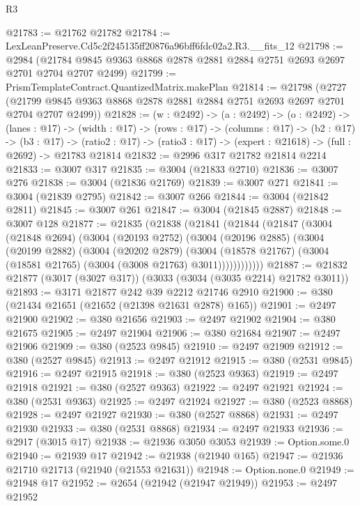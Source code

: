 \begin{lexlean}{R3}
\begin{coremodule}
@21783 := @21762 @21782
@21784 := LexLeanPreserve.Cd5c2f245135ff20876a96bff6fdc02a2.R3.__fits_12
@21798 := @2984
    (@21784 @9845 @9363 @8868 @2878 @2881 @2884 @2751 @2693 @2697 @2701 @2704 @2707 @2499)
@21799 := PrismTemplateContract.QuantizedMatrix.makePlan
@21814 := @21798
    (@2727 (@21799 @9845 @9363 @8868 @2878 @2881 @2884 @2751 @2693 @2697 @2701 @2704 @2707 @2499))
@21828 := (w : @2492) ->
  (a : @2492) ->
  (o : @2492) ->
  (lanes : @17) ->
  (width : @17) ->
  (rows : @17) ->
  (columns : @17) ->
  (b2 : @17) ->
  (b3 : @17) ->
  (ratio2 : @17) -> (ratio3 : @17) -> (expert : @21618) -> (full : @2692) -> @21783 @21814
@21832 := @2996 @317 @21782 @21814 @2214
@21833 := @3007 @317
@21835 := @3004 (@21833 @2710)
@21836 := @3007 @276
@21838 := @3004 (@21836 @21769)
@21839 := @3007 @271
@21841 := @3004 (@21839 @2795)
@21842 := @3007 @266
@21844 := @3004 (@21842 @2811)
@21845 := @3007 @261
@21847 := @3004 (@21845 @2887)
@21848 := @3007 @128
@21877 := @21835
    (@21838
      (@21841
        (@21844
          (@21847
            (@3004
              (@21848 @2694)
              (@3004
                (@20193 @2752)
                (@3004
                  (@20196 @2885)
                  (@3004
                    (@20199 @2882)
                    (@3004
                      (@20202 @2879)
                      (@3004
                        (@18578 @21767)
                        (@3004 (@18581 @21765) (@3004 (@3008 @21763) @3011))))))))))))
@21887 := @21832 @21877 (@3017 (@3027 @317)) (@3033 (@3034 (@3035 @2214) @21782 @3011))
@21893 := @3171 @21877 @242 @39 @2212 @21746 @2910
@21900 := @380 (@21434 @21651 (@21652 (@21398 @21631 @2878) @165))
@21901 := @2497 @21900
@21902 := @380 @21656
@21903 := @2497 @21902
@21904 := @380 @21675
@21905 := @2497 @21904
@21906 := @380 @21684
@21907 := @2497 @21906
@21909 := @380 (@2523 @9845)
@21910 := @2497 @21909
@21912 := @380 (@2527 @9845)
@21913 := @2497 @21912
@21915 := @380 (@2531 @9845)
@21916 := @2497 @21915
@21918 := @380 (@2523 @9363)
@21919 := @2497 @21918
@21921 := @380 (@2527 @9363)
@21922 := @2497 @21921
@21924 := @380 (@2531 @9363)
@21925 := @2497 @21924
@21927 := @380 (@2523 @8868)
@21928 := @2497 @21927
@21930 := @380 (@2527 @8868)
@21931 := @2497 @21930
@21933 := @380 (@2531 @8868)
@21934 := @2497 @21933
@21936 := @2917 (@3015 @17)
@21938 := @21936 @3050 @3053
@21939 := Option.some.{0}
@21940 := @21939 @17
@21942 := @21938 (@21940 @165)
@21947 := @21936 @21710 @21713 (@21940 (@21553 @21631))
@21948 := Option.none.{0}
@21949 := @21948 @17
@21952 := @2654 (@21942 (@21947 @21949))
@21953 := @2497 @21952

\end{coremodule}
\end{lexlean}
